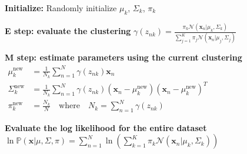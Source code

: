 \begin{algorithm}
\caption{The EM Algorithm}
\begin{algorithmic}[1] 
    \State \textbf{Initialize:} Randomly initialize $\mu_k$, $\Sigma_k$, $\pi_k$ 

    
        
        \State \textbf{E step: evaluate the clustering}
        \vspace{1.5ex} %
        \Statex \hspace{\algorithmicindent} $\displaystyle \gamma(z_{nk}) = \frac{\pi_k \mathcal{N}(\mathbf{x}_n|\mu_k,\Sigma_k)}{\sum_{j=1}^{K} \pi_j \mathcal{N}(\mathbf{x}_n|\mu_j,\Sigma_j)}$
        \vspace{2.5ex} %
        
        \State \textbf{M step: estimate parameters using the current clustering}
        \vspace{1.5ex} %
        \Statex \hspace{\algorithmicindent} $\begin{aligned}
            \mu_k^{\text{new}} &= \frac{1}{N_k} \sum_{n=1}^{N} \gamma(z_{nk}) \mathbf{x}_n \\[1.5ex]
            \Sigma_k^{\text{new}} &= \frac{1}{N_k} \sum_{n=1}^{N} \gamma (z_{nk})(\mathbf{x}_n - \mu_k^{\text{new}})(\mathbf{x}_n - \mu_k^{\text{new}})^T \\[1.5ex]
            \pi_k^\text{new} &= \frac{N_k}{N} \quad \text{where} \quad N_k = \sum_{n=1}^{N} \gamma(z_{nk})
        \end{aligned}$
        \vspace{2.5ex} %
        
        \State \textbf{Evaluate the log likelihood for the entire dataset} 
        \vspace{1.5ex} %
        \Statex \hspace{\algorithmicindent} $\displaystyle \ln \mathbb{P}(\mathbf{x}|\mu, \Sigma, \pi) = \sum_{n=1}^{N} \ln \left( \sum_{k=1}^{K} \pi_k \mathcal{N}(\mathbf{x}_n| \mu_k, \Sigma_k) \right)$
        \vspace{2ex} %

    \EndWhile
\end{algorithmic}
\end{algorithm}

